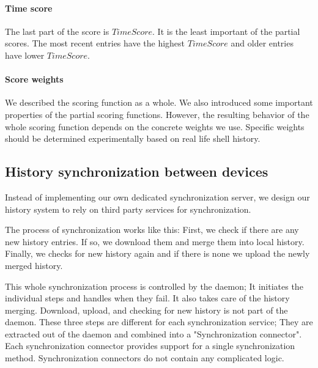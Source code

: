 \paragraph{Time score}

The last part of the score is \(TimeScore\). It is the least important of the partial scores. The most recent entries have the highest \(TimeScore\) and older entries have lower \(TimeScore\). 



\paragraph{Score weights}

We described the scoring function as a whole. We also introduced some important properties of the partial scoring functions. However, the resulting behavior of the whole scoring function depends on the concrete weights we use. 
Specific weights should be determined experimentally based on real life shell history.






\subsection{History synchronization between devices}

Instead of implementing our own dedicated synchronization server, we design our history system to rely on third party services for synchronization. 

The process of synchronization works like this: First, we check if there are any new history entries. If so, we download them and merge them into local history. Finally, we checks for new history again and if there is none we upload the newly merged history. 

This whole synchronization process is controlled by the daemon; It initiates the individual steps and handles when they fail. It also takes care of the history merging.  Download, upload, and checking for new history is not part of the daemon. These three steps are different for each synchronization service; They are extracted out of the daemon and combined into a "Synchronization connector". Each synchronization connector provides support for a single synchronization method. Synchronization connectors do not contain any complicated logic. 


